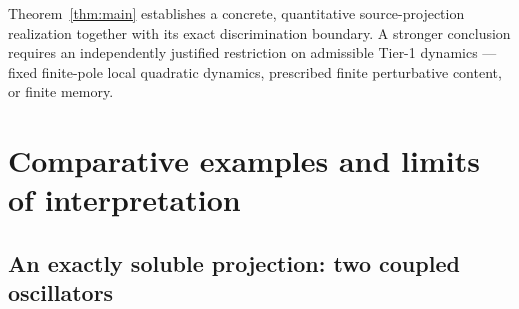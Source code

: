 \documentclass[11pt,a4paper]{article}
\theoremstyle{plain}
\theoremstyle{definition}
\begin{document}
Theorem~\ref{thm:main} establishes a concrete, quantitative
source-projection realization together with its exact discrimination
boundary. A stronger conclusion requires an independently justified
restriction on admissible Tier-1 dynamics --- fixed finite-pole local
quadratic dynamics, prescribed finite perturbative content, or finite
memory.

\section{Comparative examples and limits of interpretation}
\label{sec:controls}

\subsection{An exactly soluble projection: two coupled oscillators}
\label{sec:oscillator}
\end{document}
